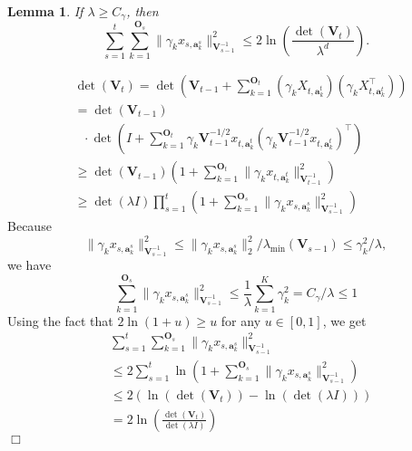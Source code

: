 \documentclass{article}
\newcommand{\ba}{\mathbf{a}}
\newcommand{\bO}{\mathbf{O}}
\newcommand{\bV}{\mathbf{V}}
\newcommand{\norm}[1]{\| #1 \|}
\newtheorem{lemma}[theorem]{Lemma}%
\newenvironment{proof}{\noindent {\textbf{Proof. }}}{$\Box$ \medskip}
\begin{document}
\begin{lemma}
If $\lambda \geq C_\gamma$, then
$$
\sum_{s=1}^t \sum_{k=1}^{\bO_s} \norm{\gamma_k x_{s,\ba_{k}^s}}_{\bV_{s-1}^{-1}}^2 \leq 2\ln \left(\frac{\det(\bV_t)}{\lambda^d} \right).
$$
\end{lemma}
\begin{proof}
\begin{align*}
&\det(\bV_t) = \det(\bV_{t-1} + \sum_{k=1}^{\bO_t} (\gamma_k X_{t,\ba_k^{t}})(\gamma_k X_{t, \ba_k^{t}}^{\top}))\\
&=\det(\bV_{t-1})\\
&~~~\cdot \det(I + \sum_{k=1}^{\bO_t} \gamma_k \bV_{t-1}^{-1/2}x_{t,\ba_{k}^{t}} (\gamma_k \bV_{t-1}^{-1/2}x_{t,\ba_{k}^{t}})^{\top})\\
&\geq \det(\bV_{t-1}) (1 + \sum_{k=1}^{\bO_t} \norm{\gamma_k x_{t,\ba_k^t}}_{\bV_{t-1}^{-1}}^2)\\
&\geq \det(\lambda I)\prod_{s=1}^{t}(1 + \sum_{k=1}^{\bO_s} \norm{\gamma_k x_{s,\ba_k^s}}_{\bV_{s-1}^{-1}}^2)
\end{align*}
Because
$$
\norm{\gamma_k x_{s,\ba_k^s}}_{\bV_{s-1}^{-1}}^2 \leq \norm{\gamma_k x_{s,\ba_k^s}}_2^2/\lambda_{\min}(\bV_{s-1}) \leq \gamma_k^2 /\lambda,
$$
we have 
$$
\sum_{k=1}^{\bO_s} \norm{\gamma_k x_{s,\ba_k^s}}_{\bV_{s-1}^{-1}}^2 \leq \frac{1}{\lambda} \sum_{k=1}^{K} \gamma_k^2 = C_\gamma /\lambda \leq 1
$$
Using the fact that $ 2\ln(1+u) \geq u$ for any $u \in [0,1]$, we get
\begin{align*}
&\sum_{s=1}^t \sum_{k=1}^{\bO_s}\norm{\gamma_k x_{s,\ba_{k}^s}}_{\bV_{s-1}^{-1}}^2 \\
&\leq 2\sum_{s=1}^t\ln(1 + \sum_{k=1}^{\bO_s} \norm{\gamma_k x_{s,\ba_k^s}}_{\bV_{s-1}^{-1}}^2)\\
&\leq 2(\ln(\det(\bV_t)) - \ln(\det(\lambda I))) \\
&= 2 \ln \left(\frac{\det(\bV_t)}{\det(\lambda I)} \right)
\end{align*}
\end{proof}
\end{document}
